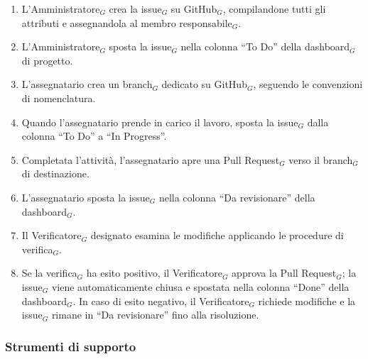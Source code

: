 \documentclass[a4paper, 10pt]{article}
\begin{document}
\begin{enumerate}
    \item L'Amministratore$_G$ crea la issue$_G$ su GitHub$_G$, compilandone tutti gli attributi e assegnandola al membro responsabile$_G$.
    \item L'Amministratore$_G$ sposta la issue$_G$ nella colonna ``To Do'' della dashboard$_G$ di progetto.
    \item L'assegnatario crea un branch$_G$ dedicato su GitHub$_G$, seguendo le convenzioni di nomenclatura.
    \item Quando l'assegnatario prende in carico il lavoro, sposta la issue$_G$ dalla colonna ``To Do'' a ``In Progress''.
    \item Completata l'attività, l'assegnatario apre una Pull Request$_G$ verso il branch$_G$ di destinazione.
    \item L'assegnatario sposta la issue$_G$ nella colonna ``Da revisionare'' della dashboard$_G$.
    \item Il Verificatore$_G$ designato esamina le modifiche applicando le procedure di verifica$_G$.
    \item Se la verifica$_G$ ha esito positivo, il Verificatore$_G$ approva la Pull Request$_G$; la issue$_G$ viene automaticamente chiusa e spostata nella colonna ``Done'' della dashboard$_G$. In caso di esito negativo, il Verificatore$_G$ richiede modifiche e la issue$_G$ rimane in ``Da revisionare'' fino alla risoluzione.
\end{enumerate}

\subsubsection{Strumenti di supporto}
\label{subsubsec:strumenti_gestione}
\end{document}

